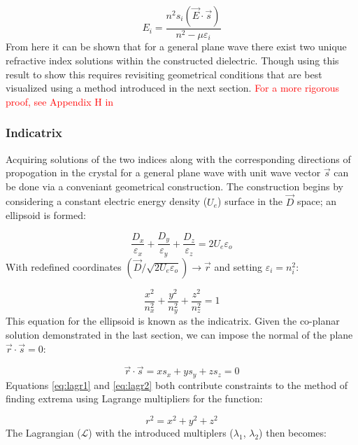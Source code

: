 \begin{equation}\label{eq:3.18}
E_i = \frac{n^2 s_i (\vec{E}\cdot\vec{s})}{n^2 - \mu \varepsilon_i}
\end{equation}
From here it can be shown that for a general plane wave there exist two unique refractive index solutions within the constructed dielectric. Though using this result to show this requires revisiting geometrical conditions that are best visualized using a method introduced in the next section. \textcolor{red}{For a more rigorous proof, see Appendix H in} \cite{nye}

\subsubsection{Indicatrix}\label{sec:indicatrix}
Acquiring solutions of the two indices along with the corresponding directions of propogation in the crystal for a general plane wave with unit wave vector $\vec{s}$ can be done via a conveniant geometrical construction. The construction begins by considering a constant electric energy density ($U_e$) surface in the $\vec{D}$ space; an ellipsoid is formed:

\begin{equation}\label{eq:lagr1}
\frac{D_x}{\varepsilon_x} + \frac{D_y}{\varepsilon_y} + \frac{D_z}{\varepsilon_z} = 2 U_e \varepsilon_o
\end{equation}
With redefined coordinates $(\vec{D}/\sqrt{2 U_e \varepsilon_o}) \rightarrow \vec{r}$ and setting $\varepsilon_i = n^2_i$:

\begin{equation}
\frac{x^2}{n_x^2} + \frac{y^2}{n_y^2} + \frac{z^2}{n_z^2} = 1
\end{equation}
This equation for the ellipsoid is known as the indicatrix. Given the co-planar solution demonstrated in the last section, we can impose the normal of the plane $\vec{r} \cdot \vec{s} = 0$:

\begin{equation}\label{eq:lagr2}
\vec{r} \cdot \vec{s} = x s_x + y s_y + z s_z = 0
\end{equation}
Equations \ref{eq:lagr1} and \ref{eq:lagr2} both contribute constraints to the method of finding extrema using Lagrange multipliers for the function:

\begin{equation}
r^2 = x^2 + y^2 + z^2
\end{equation}
The Lagrangian ($\mathcal{L}$) with the introduced multiplers ($\lambda_1$, $\lambda_2$) then becomes:

